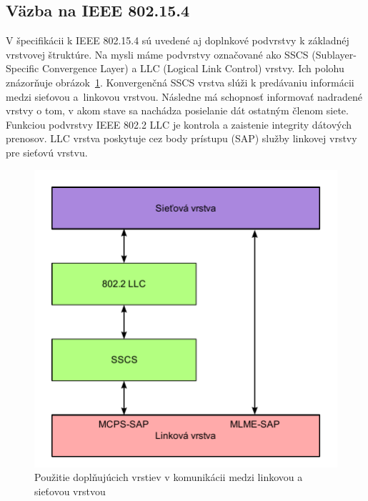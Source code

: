 \subsection{Väzba na IEEE 802.15.4}
\indent\indent V špecifikácii k IEEE 802.15.4 sú uvedené aj doplnkové podvrstvy k základnéj vrstvovej štruktúre. Na mysli máme podvrstvy označované ako SSCS (Sublayer-Specific Convergence Layer) a LLC (Logical Link Control) vrstvy. Ich polohu znázorňuje obrázok~\ref{fig:architecture_sublayers}. Konvergenčná SSCS vrstva slúži k predávaniu informácii medzi sieťovou a~linkovou vrstvou. Následne má schopnosť informovať nadradené vrstvy o tom, v akom stave sa nachádza posielanie dát ostatným členom siete. Funkciou podvrstvy IEEE 802.2 LLC  je kontrola a zaistenie integrity dátových prenosov. LLC vrstva poskytuje cez body prístupu (SAP) služby linkovej vrstvy pre sieťovú vrstvu.\\
\begin{figure}[htbp]
\begin{center}
\includegraphics[width=120mm]{figures/architecture_sublayers}
\caption{Použitie doplňujúcich vrstiev v komunikácii medzi linkovou a sieťovou vrstvou}
\label{fig:architecture_sublayers}
\end{center}
\end{figure}